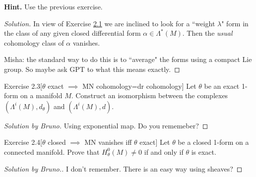 \textbf{Hint.} Use the previous exercise.

\begin{proof}[Solution]\leavevmode
In view of Exercise \hyperref[exer:2.1]{2.1} we are inclined to look for a ``weight \(\lambda\)" form in the class of any given closed differential form \(\alpha \in \Lambda^{*}(M)\). Then the \textit{usual} cohomology class of \(\alpha\) vanishes.

{\color{6}Misha:} the standard way to do this is to ``average" the forms using a compact Lie group. So maybe ask GPT to what this means exactly.
\end{proof}

\begin{thing4}{Exercise 2.3}[\(\theta\) exact \(\implies\) MN cohomology=dr cohomology]\label{exer:2.3}\leavevmode
Let \(\theta\) be an exact 1-form on a manifold \(M\). Construct an isomorphism between the complexes \((\Lambda^{i}(M),d_\theta)\) and \((\Lambda^{i}(M),d)\).
\end{thing4}

\begin{proof}[Solution by Bruno]\leavevmode
Using exponential map. Do you rememeber?
\end{proof}

\begin{thing4}{Exercise 2.4}[\(\theta\) closed \(\implies\) MN vanishes iff \(\theta\) exact]\label{exer:2.4}\leavevmode
Let \(\theta\) be a closed 1-form on a connected manifold. Prove that \(H^0_\theta(M)\neq  0\) if and only if \(\theta\) is exact.
\end{thing4}

\begin{proof}[Solution by Bruno.]\leavevmode
I don't remember. There is an easy way using sheaves?
\end{proof}

